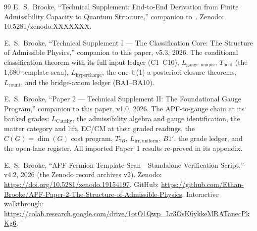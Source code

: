 \documentclass[11pt]{article}
\begin{document}
\begin{thebibliography}{99}
 E.~S.~Brooke, ``Technical Supplement: End-to-End Derivation from Finite Admissibility Capacity to Quantum Structure,'' companion to~\cite{BrookePaper1}.  Zenodo: 10.5281/zenodo.XXXXXXX.

 E.~S.~Brooke, ``Technical Supplement I --- The Classification Core: The Structure of Admissible Physics,'' companion to this paper, v5.3, 2026.  The conditional classification theorem with its full input ledger (C1--C10), $L_{\mathrm{gauge,unique}}$, $T_{\mathrm{field}}$ (the 1{,}680-template scan), $L_{\mathrm{hypercharge}}$, the one-U(1) a-posteriori closure theorems, $L_{\mathrm{count}}$, and the bridge-axiom ledger (BA1--BA10).

 E.~S.~Brooke, ``Paper 2 --- Technical Supplement II: The Foundational Gauge Program,'' companion to this paper, v1.0, 2026.  The APF-to-gauge chain at its banked grades: $L_{\mathrm{Cauchy}}$, the admissibility algebra and gauge identification, the matter category and lift, EC/CM at their graded readings, the $C(G) = \dim(G)$ cost program, $T_{7B}$, $L_{\mathrm{irr,uniform}}$, $B1'$, the grade ledger, and the open-lane register.  All imported Paper~1 results re-proved in its appendix.

 E.~S.~Brooke, ``APF Fermion Template Scan---Standalone Verification Script,'' v4.2, 2026 (the Zenodo record archives v2).  Zenodo: \url{https://doi.org/10.5281/zenodo.19154197}.  GitHub: \url{https://github.com/Ethan-Brooke/APF-Paper-2-The-Structure-of-Admissible-Physics}.  Interactive walkthrough: \url{https://colab.research.google.com/drive/1otO1Qwp_Lr3OsK6ykkeMRATanecPkKg6}.

\end{thebibliography}
\end{document}
